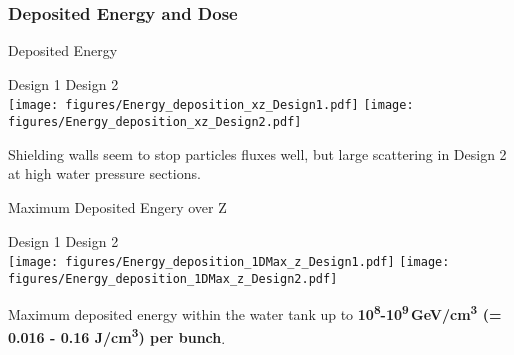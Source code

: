 \documentclass[xcolor={dvipsnames}]{beamer}
\begin{document}
\subsubsection{Deposited Energy and Dose}
\begin{frame}{Deposited Energy}
\begin{center}
\hspace*{1.6cm} Design 1 \hfill Design 2 \hspace*{1.8cm} \\
  \texttt{[image: figures/Energy\_deposition\_xz\_Design1.pdf]}
    \texttt{[image: figures/Energy\_deposition\_xz\_Design2.pdf]}
\end{center}
 Shielding walls seem to stop particles fluxes well, but large scattering in Design 2 at high water pressure sections.
\end{frame}
\begin{frame}{Maximum Deposited Engery over Z}
\begin{center}
\hspace*{1.6cm} Design 1 \hfill Design 2 \hspace*{1.8cm} \\
  \texttt{[image: figures/Energy\_deposition\_1DMax\_z\_Design1.pdf]}
    \texttt{[image: figures/Energy\_deposition\_1DMax\_z\_Design2.pdf]}
\end{center}
  Maximum deposited energy within the water tank up to \textbf{10\textsuperscript{8}-10\textsuperscript{9}\,GeV/cm\textsuperscript{3} (= 0.016 - 0.16 J/cm\textsuperscript{3}) per bunch}.
\end{frame}
\end{document}
